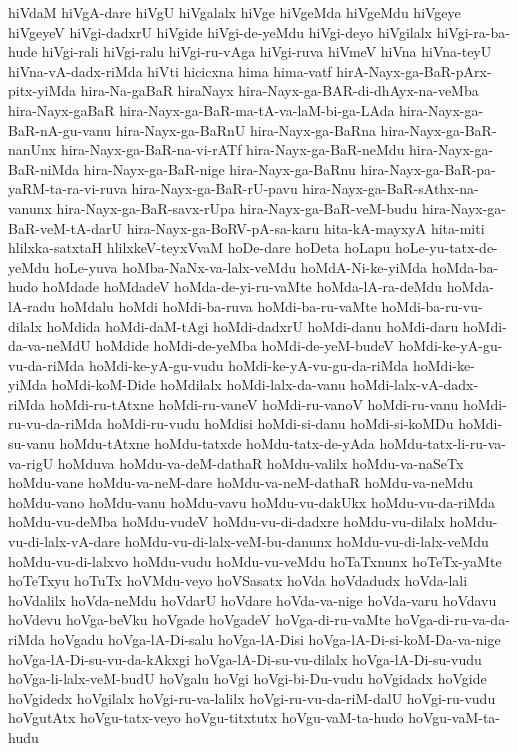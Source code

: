 {hiVdaM
hiVgA-dare
hiVgU
hiVgalalx
hiVge
hiVgeMda
hiVgeMdu
hiVgeye
hiVgeyeV
hiVgi-dadxrU
hiVgide
hiVgi-de-yeMdu
hiVgi-deyo
hiVgilalx
hiVgi-ra-ba-hude
hiVgi-rali
hiVgi-ralu
hiVgi-ru-vAga
hiVgi-ruva
hiVmeV
hiVna
hiVna-teyU
hiVna-vA-dadx-riMda
hiVti
hicicxna
hima
hima-vatf
hirA-Nayx-ga-BaR-pArx-pitx-yiMda
hira-Na-gaBaR
hiraNayx
hira-Nayx-ga-BAR-di-dhAyx-na-veMba
hira-Nayx-gaBaR
hira-Nayx-ga-BaR-ma-tA-va-laM-bi-ga-LAda
hira-Nayx-ga-BaR-nA-gu-vanu
hira-Nayx-ga-BaRnU
hira-Nayx-ga-BaRna
hira-Nayx-ga-BaR-nanUnx
hira-Nayx-ga-BaR-na-vi-rATf
hira-Nayx-ga-BaR-neMdu
hira-Nayx-ga-BaR-niMda
hira-Nayx-ga-BaR-nige
hira-Nayx-ga-BaRnu
hira-Nayx-ga-BaR-pa-yaRM-ta-ra-vi-ruva
hira-Nayx-ga-BaR-rU-pavu
hira-Nayx-ga-BaR-sAthx-na-vanunx
hira-Nayx-ga-BaR-savx-rUpa
hira-Nayx-ga-BaR-veM-budu
hira-Nayx-ga-BaR-veM-tA-darU
hira-Nayx-ga-BoRV-pA-sa-karu
hita-kA-mayxyA
hita-miti
hlilxka-satxtaH
hlilxkeV-teyxVvaM
hoDe-dare
hoDeta
hoLapu
hoLe-yu-tatx-de-yeMdu
hoLe-yuva
hoMba-NaNx-va-lalx-veMdu
hoMdA-Ni-ke-yiMda
hoMda-ba-hudo
hoMdade
hoMdadeV
hoMda-de-yi-ru-vaMte
hoMda-lA-ra-deMdu
hoMda-lA-radu
hoMdalu
hoMdi
hoMdi-ba-ruva
hoMdi-ba-ru-vaMte
hoMdi-ba-ru-vu-dilalx
hoMdida
hoMdi-daM-tAgi
hoMdi-dadxrU
hoMdi-danu
hoMdi-daru
hoMdi-da-va-neMdU
hoMdide
hoMdi-de-yeMba
hoMdi-de-yeM-budeV
hoMdi-ke-yA-gu-vu-da-riMda
hoMdi-ke-yA-gu-vudu
hoMdi-ke-yA-vu-gu-da-riMda
hoMdi-ke-yiMda
hoMdi-koM-Dide
hoMdilalx
hoMdi-lalx-da-vanu
hoMdi-lalx-vA-dadx-riMda
hoMdi-ru-tAtxne
hoMdi-ru-vaneV
hoMdi-ru-vanoV
hoMdi-ru-vanu
hoMdi-ru-vu-da-riMda
hoMdi-ru-vudu
hoMdisi
hoMdi-si-danu
hoMdi-si-koMDu
hoMdi-su-vanu
hoMdu-tAtxne
hoMdu-tatxde
hoMdu-tatx-de-yAda
hoMdu-tatx-li-ru-va-va-rigU
hoMduva
hoMdu-va-deM-dathaR
hoMdu-valilx
hoMdu-va-naSeTx
hoMdu-vane
hoMdu-va-neM-dare
hoMdu-va-neM-dathaR
hoMdu-va-neMdu
hoMdu-vano
hoMdu-vanu
hoMdu-vavu
hoMdu-vu-dakUkx
hoMdu-vu-da-riMda
hoMdu-vu-deMba
hoMdu-vudeV
hoMdu-vu-di-dadxre
hoMdu-vu-dilalx
hoMdu-vu-di-lalx-vA-dare
hoMdu-vu-di-lalx-veM-bu-danunx
hoMdu-vu-di-lalx-veMdu
hoMdu-vu-di-lalxvo
hoMdu-vudu
hoMdu-vu-veMdu
hoTaTxnunx
hoTeTx-yaMte
hoTeTxyu
hoTuTx
hoVMdu-veyo
hoVSasatx
hoVda
hoVdadudx
hoVda-lali
hoVdalilx
hoVda-neMdu
hoVdarU
hoVdare
hoVda-va-nige
hoVda-varu
hoVdavu
hoVdevu
hoVga-beVku
hoVgade
hoVgadeV
hoVga-di-ru-vaMte
hoVga-di-ru-va-da-riMda
hoVgadu
hoVga-lA-Di-salu
hoVga-lA-Disi
hoVga-lA-Di-si-koM-Da-va-nige
hoVga-lA-Di-su-vu-da-kAkxgi
hoVga-lA-Di-su-vu-dilalx
hoVga-lA-Di-su-vudu
hoVga-li-lalx-veM-budU
hoVgalu
hoVgi
hoVgi-bi-Du-vudu
hoVgidadx
hoVgide
hoVgidedx
hoVgilalx
hoVgi-ru-va-lalilx
hoVgi-ru-vu-da-riM-dalU
hoVgi-ru-vudu
hoVgutAtx
hoVgu-tatx-veyo
hoVgu-titxtutx
hoVgu-vaM-ta-hudo
hoVgu-vaM-ta-hudu
}
